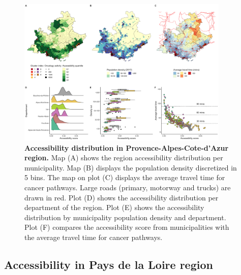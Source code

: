 \begin{figure}[H]
    \includegraphics[width=0.9\textwidth]{images/camion/fig4_accessibility_Provence-Alpes-Cote-d'Azur.png}
    \centering
    \caption{ \textbf{Accessibility distribution in Provence-Alpes-Cote-d'Azur
            region.} Map (A) shows the region accessibility distribution per
        municipality. Map (B) displays the population density discretized in 5
        bins. The map on plot (C) displays the average travel time for cancer
        pathways. Large roads (primary, motorway and trucks) are drawn in red.
        Plot (D) shows the accessibility distribution per department of the
        region. Plot (E) shows the accessibility distribution by municipality
        population density and department. Plot (F) compares the accessibility
        score from municipalities with the average travel time for cancer
        pathways. }
    \label{fig:accessibility-paca}
\end{figure}

\subsection*{Accessibility in Pays de la Loire region}

